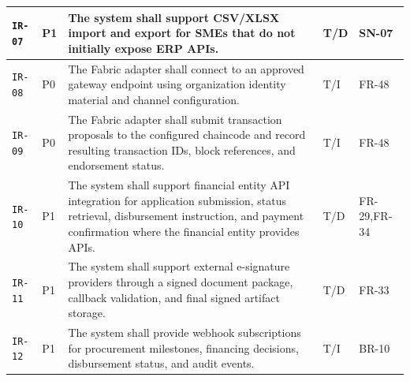 \documentclass[11pt,a4paper]{article}
\begin{document}
\begin{footnotesize}
\begin{longtable}{@{}p{}p{}p{}p{}p{}@{}}
\texttt{IR-07} & P1 & The system shall support CSV/XLSX import and export for SMEs that do not initially expose ERP APIs. & T/D & SN-07 \\ \hline
\texttt{IR-08} & P0 & The Fabric adapter shall connect to an approved gateway endpoint using organization identity material and channel configuration. & T/I & FR-48 \\ \hline
\texttt{IR-09} & P0 & The Fabric adapter shall submit transaction proposals to the configured chaincode and record resulting transaction IDs, block references, and endorsement status. & T/I & FR-48 \\ \hline
\texttt{IR-10} & P1 & The system shall support financial entity API integration for application submission, status retrieval, disbursement instruction, and payment confirmation where the financial entity provides APIs. & T/D & FR-29,FR-34 \\ \hline
\texttt{IR-11} & P1 & The system shall support external e-signature providers through a signed document package, callback validation, and final signed artifact storage. & T/D & FR-33 \\ \hline
\texttt{IR-12} & P1 & The system shall provide webhook subscriptions for procurement milestones, financing decisions, disbursement status, and audit events. & T/I & BR-10 \\ \hline
\end{longtable}
\end{footnotesize}
\end{document}
